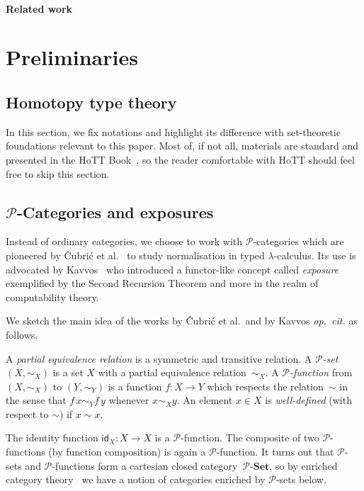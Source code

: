 \documentclass[a4paper,UKenglish,numberwithinsect,cleveref,thm-restate]{lipics-v2021}
\numberwithin{equation}{section}
\newcommand{\PP}{\mathscr{P}}
\newcommand{\id}{\mathsf{id}}
\theoremstyle{plain}
\begin{document}
\paragraph*{Related work}
\cite{Visser2019,Beklemishev2006}
\cite{Kavvos2020}
\cite{Shamkanov2014,Shamkanov2016a}

\section{Preliminaries}\label{sec:preliminaries}

\subsection{Homotopy type theory}
In this section, we fix notations and highlight its difference with set-theoretic foundations relevant to this paper.
Most of, if not all, materials are standard and presented in the HoTT Book~\cite{hottbook}, so the reader comfortable with HoTT should feel free to skip this section.

\subsection{\texorpdfstring{$\PP$}{P}-Categories and exposures}
Instead of ordinary categories, we choose to work with $\PP$-categories which are pioneered by \v{C}ubri\'c et al.~\cite{Cubric1998a} to study normalisation in typed $\lambda$-calculus.
Its use is advocated by Kavvos~\cite{Kavvos2017b} who introduced a functor-like concept called \emph{exposure} exemplified by the Second Recursion Theorem and more in the realm of computability theory.

We sketch the main idea of the works by \v{C}ubri\'c et al.\ and by Kavvos \emph{op.\ cit.} as follows.
\begin{definition}
  A \emph{partial equivalence relation} is a symmetric and transitive relation.
  A \emph{$\PP$-set} $(X, \sim_X)$ is a set $X$ with a partial equivalence relation~$\sim_X$.
  A \emph{$\PP$-function} from $(X, \sim_X)$ to $(Y, \sim_Y)$ is a function $f\colon X \to Y$ which respects the relation~$\sim$ in the sense that $f\,x \sim_Y f\,y$ whenever $x \sim_X y$.
  An element $x \in X$ is \emph{well-defined} (with respect to $\sim$) if $x \sim x$.
\end{definition}
The identity function $\id_X : X \to X$ is a $\PP$-function.
The composite of two $\PP$-functions (by function composition) is again a $\PP$-function.
It turns out that $\PP$-sets and $\PP$-functions form a cartesian closed category~$\PP\text{-}\mathbf{Set}$, so by enriched category theory~\cite{Kelly1982} we have a notion of categories enriched by $\PP$-sets below.
\end{document}
